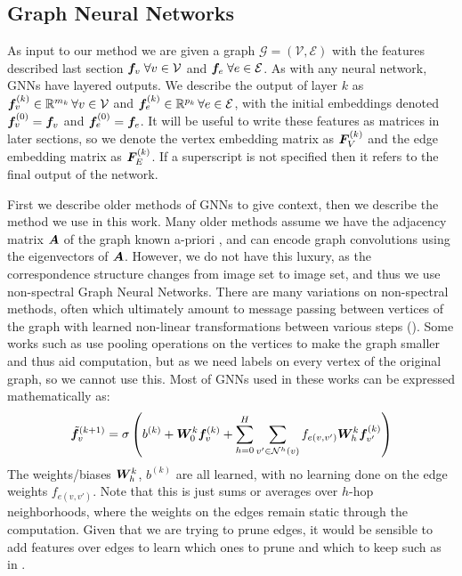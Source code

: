 \documentclass{article} %
\begin{document}
\subsection{Graph Neural Networks}
As input to our method we are given a graph $\mathcal{G} = (\mathcal{V}, \mathcal{E})$ with the features described last section ${\bm{f}}_v \; \forall v \in \mathcal{V}$ and ${\bm{f}}_e \; \forall e \in \mathcal{E}$.
As with any neural network, GNNs have layered outputs.
We describe the output of layer $k$ as ${\bm{f}}_v^{(k)} \in {\mathbb{R}}^{m_k} \, \forall v \in \mathcal{V}$ and ${\bm{f}}_e^{(k)} \in {\mathbb{R}}^{p_k}\, \forall e \in \mathcal{E}$, with the initial embeddings denoted ${\bm{f}}_v^{(0)} = {\bm{f}}_v$ and ${\bm{f}}_e^{(0)} = {\bm{f}}_e$.
It will be useful to write these features as matrices in later sections, so we denote the vertex embedding matrix as ${\bm{F}}_V^{(k)}$ and the edge embedding matrix as ${\bm{F}}_E^{(k)}$.
If a superscript is not specified then it refers to the final output of the network.

First we describe older methods of GNNs to give context, then we describe the method we use in this work.
Many older methods assume we have the adjacency matrix ${\bm{A}}$ of the graph known a-priori \cite{bruna2013spectral}, and can encode graph convolutions using the eigenvectors of ${\bm{A}}$.
However, we do not have this luxury, as the correspondence structure changes from image set to image set, and thus we use non-spectral Graph Neural Networks.
There are many variations on non-spectral methods, often which ultimately amount to message passing between vertices of the graph with learned non-linear transformations between various steps (\cite{kipf2017semi, defferrard2016convolutional, gama2018mimo, gama2018convolutional}).
Some works such as \cite{gama2019convolutional} use pooling operations on the vertices to make the graph smaller and thus aid computation, but as we need labels on every vertex of the original graph, so we cannot use this.
Most of GNNs used in these works can be expressed mathematically as:
\begin{align*}
\tilde{{\bm{f}}}_v^{(k+1)} =&\; \sigma\left( b^{(k)} + {\bm{W}}_0^{k} {\bm{f}}_{v}^{(k)} + \sum_{h=0}^H \sum_{v' \in \mathcal{N}^{h}(v)} f_{e(v,v')} {\bm{W}}_{h}^{k} {\bm{f}}_{v'}^{(k)} \right) \\
\end{align*}
The weights/biases ${\bm{W}}_{h}^{k}$, $b^{(k)}$ are all learned, with no learning done on the edge weights $f_{e(v,v')}$. 
Note that this is just sums or averages over $h$-hop neighborhoods, where the weights on the edges remain static through the computation.
Given that we are trying to prune edges, it would be sensible to add features over edges to learn which ones to prune and which to keep such as in \cite{scarselli2009graph}.
\end{document}
